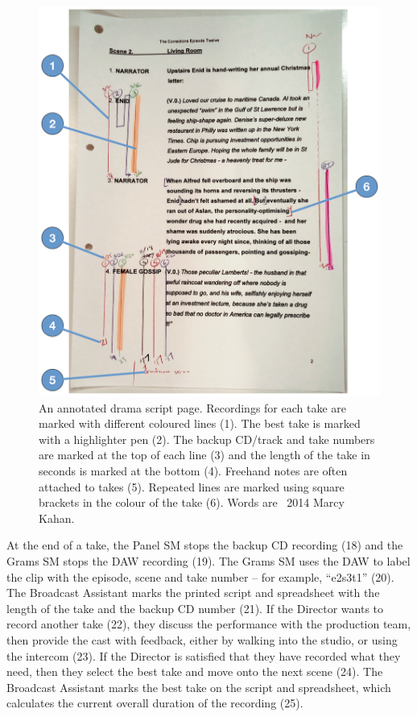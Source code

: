 \begin{figure}
  \centering
  \includegraphics[width=\columnwidth]{figs/drama-markup-labelled.pdf}
  \caption[An annotated drama script page.]{An annotated drama script page. Recordings for each take are marked with
    different coloured lines (1). The best take is marked with a highlighter pen (2). The backup CD/track and take
    numbers are marked at the top of each line (3) and the length of the take in seconds is marked at the bottom (4).
    Freehand notes are often attached to takes (5). Repeated lines are marked using square brackets in the colour of
  the take (6). Words are \textcopyright~2014 Marcy Kahan.}
  \label{fig:drama-script}
\end{figure}

At the end of a take, the Panel SM stops the backup CD recording (18) and the Grams SM stops the DAW recording (19).
The Grams SM uses the DAW to label the clip with the episode, scene and take number -- for example, ``e2s3t1'' (20).
The Broadcast Assistant marks the printed script and spreadsheet with the length of the take and the backup CD number
(21).  If the Director wants to record another take (22), they discuss the performance with the production team, then
provide the cast with feedback, either by walking into the studio, or using the intercom (23).  If the Director is
satisfied that they have recorded what they need, then they select the best take and move onto the next scene (24). The
Broadcast Assistant marks the best take on the script and spreadsheet, which calculates the current overall duration of
the recording (25).


